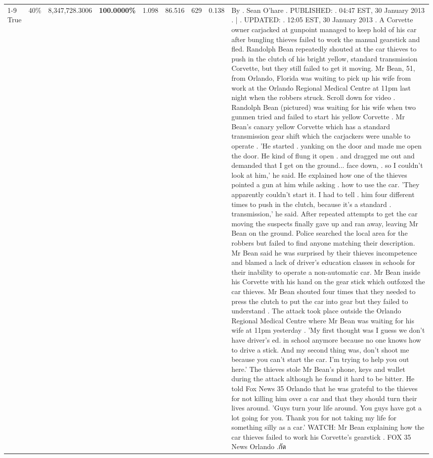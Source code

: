 \begin{table}[H]
\begin{tabular}{lllrlllll}
\cline{1-9} \cline{2-9}
True & 40\% & 8,347,728.3006 & \bfseries \color{red} 100.0000\% & 1.098 & 86.516 & 629 & 0.138 & By . Sean O'hare . PUBLISHED: . 04:47 EST, 30 January 2013 . | . UPDATED: . 12:05 EST, 30 January 2013 . A Corvette owner carjacked at gunpoint managed to keep hold of his car after bungling thieves failed to work the manual gearstick and fled. Randolph Bean repeatedly shouted at the car thieves to push in the clutch of his bright yellow, standard transmission Corvette, but they still failed to get it moving. Mr Bean, 51, from Orlando, Florida was waiting to pick up his wife from work at the Orlando Regional Medical Centre at 11pm last night when the robbers struck. Scroll down for video . Randolph Bean (pictured) was waiting for his wife when two gunmen tried and failed to start his yellow Corvette . Mr Bean's canary yellow Corvette which has a standard transmission gear shift which the carjackers were unable to operate . 'He started . yanking on the door and made me open the door. He kind of flung it open . and dragged me out and demanded that I get on the ground... face down, . so I couldn't look at him,' he said. He explained how one of the thieves pointed a gun at him while asking . how to use the car. 'They apparently couldn't start it. I had to tell . him four different times to push in the clutch, because it's a standard . transmission,' he said. After repeated attempts to get the car moving the suspects finally gave up and ran away, leaving Mr Bean on the ground. Police searched the local area for the robbers but failed to find anyone matching their description. Mr Bean said he was surprised by their thieves incompetence and blamed a lack of driver's education classes in schools for their inability to operate a non-automatic car. Mr Bean inside his Corvette with his hand on the gear stick which outfoxed the car thieves. Mr Bean shouted four times that they needed to press the clutch to put the car into gear but they failed to understand . The attack took place outside the Orlando Regional Medical Centre where Mr Bean was waiting for his wife at 11pm yesterday . 'My first thought was I guess we don't have driver's ed. in school anymore because no one knows how to drive a stick. And my second thing was, don't shoot me because you can't start the car. I'm trying to help you out here.' The thieves stole Mr Bean's phone, keys and wallet during the attack although he found it hard to be bitter. He told Fox News 35 Orlando that he was grateful to the thieves for not killing him over a car and that they should turn their lives around. 'Guys turn your life around. You guys have got a lot going for you. Thank you for not taking my life for something silly as a car.' WATCH: Mr Bean explaining how the car thieves failed to work his Corvette's gearstick . FOX 35 News Orlando .กัด \\

\end{tabular}
\end{table}
